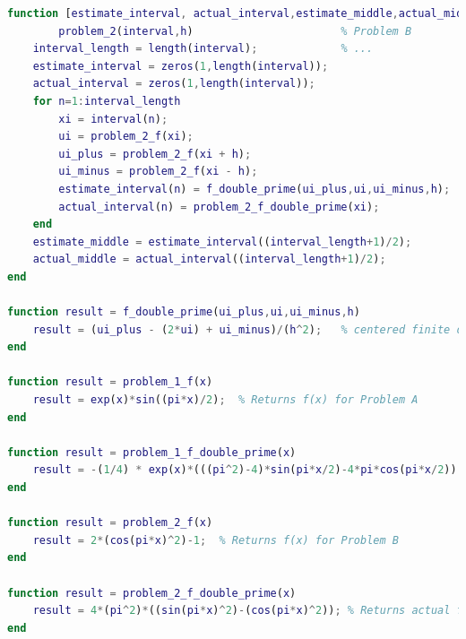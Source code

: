 \documentclass[10pt,letterpaper]{article}
\begin{document}
\begin{lstlisting}[language = Matlab]
function [estimate_interval, actual_interval,estimate_middle,actual_middle] = ...
        problem_2(interval,h)                       % Problem B
    interval_length = length(interval);             % ...
    estimate_interval = zeros(1,length(interval));
    actual_interval = zeros(1,length(interval));
    for n=1:interval_length
        xi = interval(n);
        ui = problem_2_f(xi);
        ui_plus = problem_2_f(xi + h);
        ui_minus = problem_2_f(xi - h);
        estimate_interval(n) = f_double_prime(ui_plus,ui,ui_minus,h);
        actual_interval(n) = problem_2_f_double_prime(xi);
    end
    estimate_middle = estimate_interval((interval_length+1)/2);
    actual_middle = actual_interval((interval_length+1)/2);
end

function result = f_double_prime(ui_plus,ui,ui_minus,h)
    result = (ui_plus - (2*ui) + ui_minus)/(h^2);   % centered finite difference approximation of f"(x)
end

function result = problem_1_f(x)
    result = exp(x)*sin((pi*x)/2);  % Returns f(x) for Problem A
end

function result = problem_1_f_double_prime(x)
    result = -(1/4) * exp(x)*(((pi^2)-4)*sin(pi*x/2)-4*pi*cos(pi*x/2)); % Returns actual f"(x) for Problem A
end

function result = problem_2_f(x)
    result = 2*(cos(pi*x)^2)-1;  % Returns f(x) for Problem B
end

function result = problem_2_f_double_prime(x)
    result = 4*(pi^2)*((sin(pi*x)^2)-(cos(pi*x)^2)); % Returns actual f"(x) for Problem B
end
\end{lstlisting}
\end{document}
